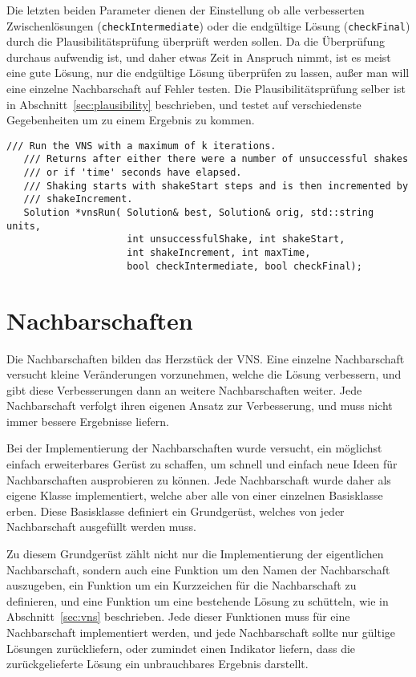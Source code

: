 Die letzten beiden Parameter dienen der Einstellung ob alle verbesserten Zwischenlösungen (\texttt{checkIntermediate}) oder die endgültige Lösung (\texttt{checkFinal}) durch die Plausibilitätsprüfung überprüft werden sollen.
Da die Überprüfung durchaus aufwendig ist, und daher etwas Zeit in Anspruch nimmt, ist es meist eine gute Lösung, nur die endgültige Lösung überprüfen zu lassen, außer man will eine einzelne Nachbarschaft
auf Fehler testen. Die Plausibilitätsprüfung selber ist in Abschnitt~\ref{sec:plausibility} beschrieben, und testet auf verschiedenste Gegebenheiten um zu einem Ergebnis zu kommen.

\singlespacing
\begin{lstlisting}[caption={Signatur der Funktion, welche die Variable Nachbarschaftssuche ausführt und steuert},label={lst:vns}]
   /// Run the VNS with a maximum of k iterations.
   /// Returns after either there were a number of unsuccessful shakes 
   /// or if 'time' seconds have elapsed.
   /// Shaking starts with shakeStart steps and is then incremented by
   /// shakeIncrement.
   Solution *vnsRun( Solution& best, Solution& orig, std::string units, 
                     int unsuccessfulShake, int shakeStart, 
                     int shakeIncrement, int maxTime, 
                     bool checkIntermediate, bool checkFinal);
\end{lstlisting}

\section{Nachbarschaften}
Die Nachbarschaften bilden das Herzstück der VNS. Eine einzelne Nachbarschaft versucht kleine Veränderungen vorzunehmen, welche die Lösung verbessern, und gibt diese Verbesserungen dann an weitere Nachbarschaften weiter.
Jede Nachbarschaft verfolgt ihren eigenen Ansatz zur Verbesserung, und muss nicht immer bessere Ergebnisse liefern. 

Bei der Implementierung der Nachbarschaften wurde versucht, ein möglichst einfach erweiterbares Gerüst zu schaffen, um schnell und einfach neue Ideen für Nachbarschaften ausprobieren zu können. Jede Nachbarschaft
wurde daher als eigene Klasse implementiert, welche aber alle von einer einzelnen Basisklasse erben. Diese Basisklasse definiert ein Grundgerüst, welches von jeder Nachbarschaft ausgefüllt werden muss. 

Zu diesem Grundgerüst zählt nicht nur die Implementierung der eigentlichen Nachbarschaft, sondern auch eine Funktion um den Namen der Nachbarschaft auszugeben, ein Funktion um ein Kurzzeichen für die Nachbarschaft
zu definieren, und eine Funktion um eine bestehende Lösung zu schütteln, wie in Abschnitt~\ref{sec:vns} beschrieben. Jede dieser Funktionen muss für eine Nachbarschaft implementiert werden, und jede Nachbarschaft
sollte nur gültige Lösungen zurückliefern, oder zumindet einen Indikator liefern, dass die zurückgelieferte Lösung ein unbrauchbares Ergebnis darstellt.

